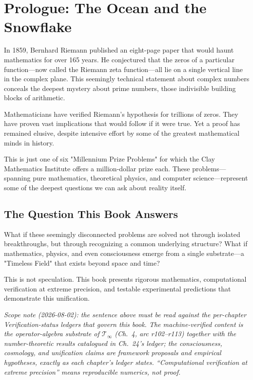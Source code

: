 \chapter*{Prologue: The Ocean and the Snowflake}

\begingroup
\sloppy

In 1859, Bernhard Riemann published an eight-page paper that would haunt mathematics for over 165 years. He conjectured that the zeros of a particular function—now called the Riemann zeta function—all lie on a single vertical line in the complex plane. This seemingly technical statement about complex numbers conceals the deepest mystery about prime numbers, those indivisible building blocks of arithmetic.

Mathematicians have verified Riemann's hypothesis for trillions of zeros. They have proven vast implications that would follow if it were true. Yet a proof has remained elusive, despite intensive effort by some of the greatest mathematical minds in history.

This is just one of six "Millennium Prize Problems" for which the Clay Mathematics Institute offers a million-dollar prize each. These problems—spanning pure mathematics, theoretical physics, and computer science—represent some of the deepest questions we can ask about reality itself.

\section*{The Question This Book Answers}

What if these seemingly disconnected problems are solved not through isolated breakthroughs, but through recognizing a common underlying structure? What if mathematics, physics, and even consciousness emerge from a single substrate—a "Timeless Field" that exists beyond space and time?

This is not speculation. This book presents rigorous mathematics, computational verification at extreme precision, and testable experimental predictions that demonstrate this unification.

\noindent\emph{Scope note (2026-08-02): the sentence above must be read against the per-chapter Verification-status ledgers that govern this book. The machine-verified content is the operator-algebra substrate of $\mathcal{T}_\infty$ (Ch.~4, arc r102--r113) together with the number-theoretic results catalogued in Ch.~24's ledger; the consciousness, cosmology, and unification claims are framework proposals and empirical hypotheses, exactly as each chapter's ledger states. ``Computational verification at extreme precision'' means reproducible numerics, not proof.}

